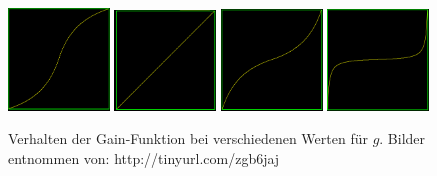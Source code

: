 \begin{figure}[!hbtp]%
	\centering
	{\includegraphics[width=0.24\textwidth]{images/gain025.png}}
	 {\includegraphics[width=0.24\textwidth]{images/gain05.png}}
	 {\includegraphics[width=0.24\textwidth]{images/gain075.png}}
	 {\includegraphics[width=0.24\textwidth]{images/gain097.png}}
	\caption{Verhalten der Gain-Funktion bei verschiedenen Werten für $g$. Bilder entnommen von: http://tinyurl.com/zgb6jaj}\label{img.gain}
\end{figure}


